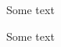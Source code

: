 \documentclass{article}
\begin{document}
\begin{mythm}
   Some text
\end{mythm}

\begin{mythm}
   Some text
\end{mythm}
\end{document}
